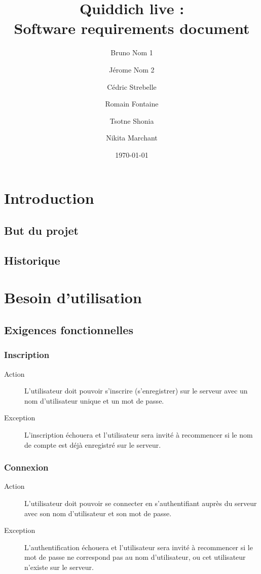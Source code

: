 \documentclass[a4paper]{article}
\title{Quiddich live : \\Software requirements document}
\author{Bruno Nom 1 \and Jérome Nom 2 \and Cédric Strebelle \and
Romain Fontaine \and Tsotne Shonia \and Nikita Marchant}
\date{\today}
\begin{document}
\maketitle

\section{Introduction}
\subsection{But du projet}

\printglossary[numberedsection]
\subsection{Historique}

\section{Besoin d'utilisation}
\subsection{Exigences fonctionnelles}

\subsubsection{Inscription}
\begin{description}
\item[Action] L'\gls{utilisateur} doit pouvoir s'inscrire (s'enregistrer) sur le \gls{serveur} avec un nom d'\gls{utilisateur} unique et un mot de passe.
\item[Exception] L'inscription échouera et l'\gls{utilisateur} sera invité à recommencer si le nom de compte est déjà enregistré sur le \gls{serveur}.
\end{description}

\subsubsection{Connexion}
\begin{description}
\item[Action] L'\gls{utilisateur} doit pouvoir se connecter en s'authentifiant auprès du \gls{serveur} avec son nom d'\gls{utilisateur} et son mot de passe.
\item[Exception] L'authentification échouera et l'\gls{utilisateur} sera invité à recommencer si le mot de passe ne correspond pas au nom d'\gls{utilisateur}, ou cet \gls{utilisateur} n'existe sur le \gls{serveur}.
\end{description}
\end{document}
